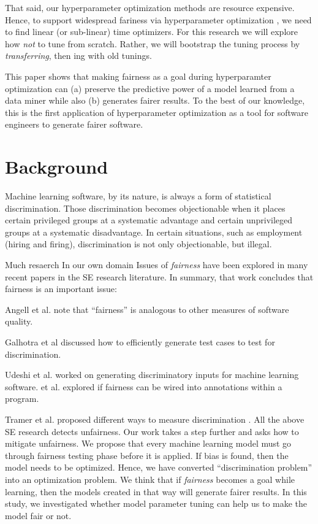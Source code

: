   That said, our
  hyperparameter optimization methods are resource expensive. Hence, to support    widespread fariness via hyperparameter optimization , we need to find linear (or sub-linear) time optimizers. 
  For this research we will explore how   {\em not} to tune from scratch.
  Rather, we will bootstrap the  tuning
  process by  {\em transferring}, then {\IT}ing with  old tunings.
  
This paper shows that making fairness as a goal during hyperparamter optimization can (a) preserve the predictive power of a model learned from a data miner while also (b) generates fairer results. To the best of our knowledge, this is the first application of hyperparameter optimization as a tool for software engineers to generate fairer software.


 \section{Background}\label{tion:back}

Machine learning software, by its nature, is always a form of statistical discrimination. 
Those discrimination becomes objectionable when it places certain privileged groups at  a systematic advantage and certain unprivileged groups at a systematic disadvantage. In certain situations, such as employment (hiring and firing), discrimination is not only objectionable, but illegal.

Much resaerch In our own domain Issues of \textit{fairness} have been explored in many  recent papers in the SE research literature.
In summary, that work concludes that fairness is an important issue:
\bi
\item Angell et al. \cite{Angell:2018:TAT:3236024.3264590}  note that     ``fairness'' is analogous to other measures of software quality. \item Galhotra et al discussed how to efficiently generate test cases to test for discrimination\cite{Galhotra_2017}. \item Udeshi et al. \cite{Udeshi_2018} worked on generating discriminatory  inputs for machine learning software. \itemAlbarghouthi et al. \cite{Albarghouthi:2019:FP:3287560.3287588} explored if fairness can be wired into annotations within a program.
\item Tramer et al. proposed different ways to measure discrimination \cite{Tramer_2017}.
\ei
All the above SE research detects unfairness. Our work takes a step further and asks how to mitigate
unfairness. We propose that every machine learning model must go through fairness testing phase before it is applied. If bias is found, then the model needs to be optimized. Hence, we have converted ``discrimination problem'' into an optimization problem. We think that if \textit{fairness} becomes a goal while learning, then the  models created in that way will generate fairer results. In this study, we investigated whether model parameter tuning can help us to make the model fair or not. 
 
